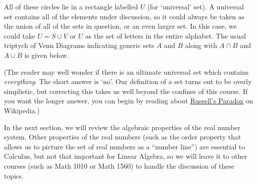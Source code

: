 \medskip

All of these circles lie in a rectangle labelled $U$ (for `universal' set).  A universal set contains all of the elements under discussion, so it could always be taken as the union of all of the sets in question, or an even larger set.  In this case, we could take $U = S \cup V$ or $U$ as the set of letters in the entire alphabet.    The usual triptych of Venn Diagrams indicating generic sets $A$ and  $B$ along with $A \cap B$ and $A \cup B$ is given below.

(The reader may well wonder if there is an ultimate universal set which contains \textit{everything}.  The short answer is `no'. Our definition of a set turns out to be overly simplistic, but correcting this takes us well beyond the confines of this course. If you want the longer answer, you can begin by reading about \href{http://en.wikipedia.org/wiki/Russell's_paradox}{\underline{Russell's Paradox}} on Wikipedia.)





In the next section, we will review the algebraic properties of the real number system. Other properties of the real numbers (such as the order property that allows us to picture the set of real numbers as a ``number line'') are essential to Calculus, but not that important for Linear Algebra, so we will leave it to other courses (such as Math 1010 or Math 1560) to handle the discussion of these topics.

\clearpage
